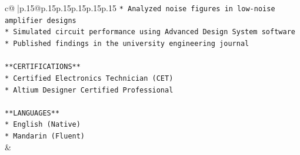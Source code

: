 \documentclass{article}
\begin{document}
{\begin{supertabular}{c@{$\;$}|p{.15\linewidth}@{}p{.15\linewidth}p{.15\linewidth}p{.15\linewidth}p{.15\linewidth}p{.15\linewidth}}
{{{\texttt{*   Analyzed noise figures in low{-}noise amplifier designs} \\
\texttt{*   Simulated circuit performance using Advanced Design System software} \\
\texttt{*   Published findings in the university engineering journal} \\
\\ 
\texttt{**CERTIFICATIONS**} \\
\texttt{*   Certified Electronics Technician (CET)} \\
\texttt{*   Altium Designer Certified Professional} \\
\\ 
\texttt{**LANGUAGES**} \\
\texttt{*   English (Native)} \\
\texttt{*   Mandarin (Fluent)} \\
            }
        }
    }
    & \\ \\


\end{supertabular}}
\end{document}
